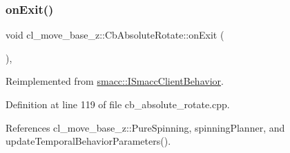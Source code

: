 \mbox{\label{classcl__move__base__z_1_1CbAbsoluteRotate_a0e362b8e9f0d7de5aeee183ba4031437}} 
\subsubsection{\texorpdfstring{on\+Exit()}{onExit()}}
{\footnotesize\ttfamily void cl\+\_\+move\+\_\+base\+\_\+z\+::\+Cb\+Absolute\+Rotate\+::on\+Exit (\begin{DoxyParamCaption}{ }\end{DoxyParamCaption})\hspace{0.3cm}{\ttfamily [override]}, {\ttfamily [virtual]}}



Reimplemented from \hyperlink{classsmacc_1_1ISmaccClientBehavior_a36bf771905e3bf750909a15e4215a9b3}{smacc\+::\+I\+Smacc\+Client\+Behavior}.



Definition at line 119 of file cb\+\_\+absolute\+\_\+rotate.\+cpp.



References cl\+\_\+move\+\_\+base\+\_\+z\+::\+Pure\+Spinning, spinning\+Planner, and update\+Temporal\+Behavior\+Parameters().


